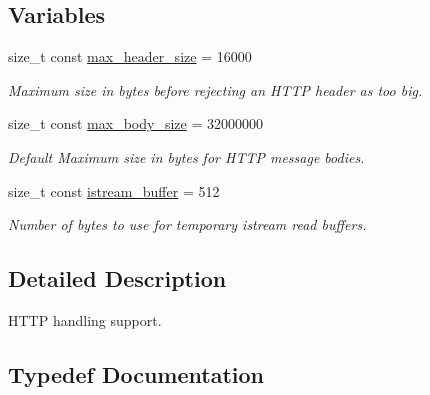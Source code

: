 \subsection*{Variables}
\begin{DoxyCompactItemize}
\item 
\mbox{\label{namespacewebsocketpp_1_1http_a514b8c48c36a9e42964f9ea35a82bc95}} 
size\+\_\+t const \mbox{\hyperlink{namespacewebsocketpp_1_1http_a514b8c48c36a9e42964f9ea35a82bc95}{max\+\_\+header\+\_\+size}} = 16000
\begin{DoxyCompactList}\small\item\em Maximum size in bytes before rejecting an H\+T\+TP header as too big. \end{DoxyCompactList}\item 
\mbox{\label{namespacewebsocketpp_1_1http_a0cc54432842e22de04c4985cba23f54f}} 
size\+\_\+t const \mbox{\hyperlink{namespacewebsocketpp_1_1http_a0cc54432842e22de04c4985cba23f54f}{max\+\_\+body\+\_\+size}} = 32000000
\begin{DoxyCompactList}\small\item\em Default Maximum size in bytes for H\+T\+TP message bodies. \end{DoxyCompactList}\item 
\mbox{\label{namespacewebsocketpp_1_1http_a3632e5504bc2aeaa6b82d1cbffc2ec10}} 
size\+\_\+t const \mbox{\hyperlink{namespacewebsocketpp_1_1http_a3632e5504bc2aeaa6b82d1cbffc2ec10}{istream\+\_\+buffer}} = 512
\begin{DoxyCompactList}\small\item\em Number of bytes to use for temporary istream read buffers. \end{DoxyCompactList}\end{DoxyCompactItemize}


\subsection{Detailed Description}
H\+T\+TP handling support. 

\subsection{Typedef Documentation}
\mbox{\label{namespacewebsocketpp_1_1http_a9744f4104772b987aa9e86c35ce1357b}} 

